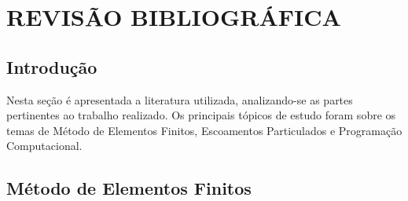 \chapter{REVISÃO BIBLIOGRÁFICA}
\label{rev_bib}
\section{\textbf{Introdução}}
Nesta seção é apresentada a literatura utilizada, analizando-se as partes pertinentes ao trabalho realizado. Os principais tópicos de estudo foram sobre os temas de Método de Elementos Finitos, Escoamentos Particulados e Programação Computacional. 

\section{\textbf{Método de Elementos Finitos}}
